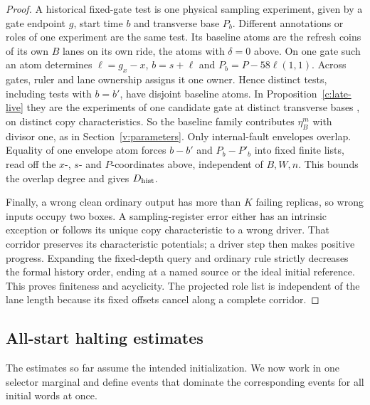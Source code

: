 \begin{proof}
A historical fixed-gate test is one physical sampling experiment,
given by a gate endpoint \(g\), start time \(b\) and transverse base
\(P_b\). Different annotations or roles of one experiment are the
same test. Its baseline atoms are the refresh coins of its own \(B\)
lanes on its own ride, the atoms with \(\delta=0\) above. On one
gate such an atom determines \(\ell=g_x-x\), \(b=s+\ell\) and
\(P_b=P-58\ell(1,1)\). Across gates, ruler and lane ownership
\cite[Lemmas~10.4 and~11.4]{DMNoise2026} assigns it one owner.
Hence distinct tests, including tests with \(b=b'\), have disjoint
baseline atoms. In Proposition~\ref{c:late-live} they are the
experiments of one candidate gate at distinct transverse bases
\cite[Lemma~11.6]{DMNoise2026}, on distinct copy characteristics.
So the baseline family contributes \(\eta_B^m\) with divisor one,
as in Section~\ref{v:parameters}. Only internal-fault envelopes
overlap. Equality of one envelope atom forces \(b-b'\) and
\(P_b-P'_b\) into fixed finite lists, read off the \(x\)-, \(s\)-
and \(P\)-coordinates above, independent of \(B,W,n\). This bounds
the overlap degree and gives \(D_{\rm hist}\).

Finally, a wrong clean ordinary output has more than \(K\) failing
replicas, so wrong inputs occupy two boxes. A sampling-register error either has
an intrinsic exception or follows its unique copy characteristic to a
wrong driver. That corridor preserves its characteristic potentials;
a driver step then makes positive progress. Expanding the fixed-depth
query and ordinary rule strictly decreases the formal history order,
ending at a named source or the ideal initial reference. This proves
finiteness and acyclicity. The projected role list is independent of the
lane length because its fixed offsets cancel along a complete corridor.
\end{proof}

\subsection{All-start halting estimates}
The estimates so far assume the intended initialization. We now work in one selector marginal and define events that dominate the corresponding events for all initial words at once.

